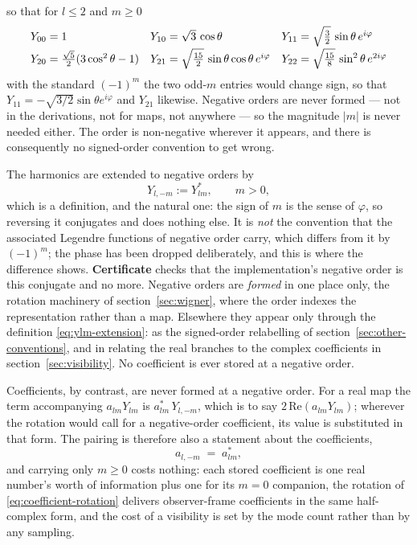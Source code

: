 so that for $l \le 2$ and $m \ge 0$
\begin{equation}
  \begin{matrix}
      Y_{00} = 1 \hfill
    & Y_{10} = \sqrt{3}\,\cos\theta \hfill
    & Y_{11} = \sqrt{\tfrac32}\,\sin\theta\,e^{i\varphi} \hfill \\[4pt]
      Y_{20} = \tfrac{\sqrt{5}}{2}(3\cos^{2}\theta-1) \hfill
    & Y_{21} = \sqrt{\tfrac{15}{2}}\,\sin\theta\cos\theta\,e^{i\varphi} \hfill
    & Y_{22} = \sqrt{\tfrac{15}{8}}\,\sin^{2}\theta\,e^{2i\varphi} \hfill
  \end{matrix}
  \label{eq:ylm-table}
\end{equation}
with the standard $(-1)^m$ the two odd-$m$ entries would change sign, so that
$Y_{11} = -\sqrt{3/2}\sin\theta e^{i\varphi}$ and $Y_{21}$ likewise.  Negative orders are never formed --- not in the derivations, not for
maps, not anywhere --- so the magnitude $|m|$ is never needed either.  The order is
non-negative wherever it appears, and there is consequently no signed-order
convention to get wrong.

The harmonics are extended to negative orders by
\begin{equation}
  Y_{l,-m} := Y_{lm}^* , \qquad m > 0 ,
  \label{eq:ylm-extension}
\end{equation}
which is a definition, and the natural one: the sign of $m$ is the sense of
$\varphi$, so reversing it conjugates and does nothing else.  It is \emph{not} the convention
that the associated Legendre functions of negative order carry, which differs from it by
$(-1)^m$; the phase has been dropped deliberately, and this is where the difference shows.
\textbf{Certificate } checks that the implementation's negative order is this
conjugate and no more.  Negative
orders are \emph{formed} in one place only, the rotation machinery of
section~\ref{sec:wigner}, where the order indexes the representation rather than a map.
Elsewhere they appear only through the definition \eqref{eq:ylm-extension}: as the
signed-order relabelling of section~\ref{sec:other-conventions}, and in relating the real
branches to the complex coefficients in section~\ref{sec:visibility}.  No coefficient is ever
stored at a negative order.

Coefficients, by contrast, are never formed at a negative order.  For a real map
the term accompanying $a_{lm} Y_{lm}$ is $a_{lm}^* \, Y_{l,-m}$,
which is to say $2\,\mathrm{Re}(a_{lm} Y_{lm})$; wherever the rotation would call
for a negative-order coefficient, its value is substituted in that form.  The pairing is
therefore also a statement about the coefficients,
\begin{equation}
  a_{l,-m} \;=\; a_{lm}^* ,
  \label{eq:pairing-reality}
\end{equation}
and carrying only $m \ge 0$ costs nothing: each stored coefficient is one real number's worth
of information plus one for its $m = 0$ companion, the rotation of \eqref{eq:coefficient-rotation}
delivers observer-frame coefficients in the same half-complex form, and the cost of a
visibility is set by the mode count rather than by any sampling.

